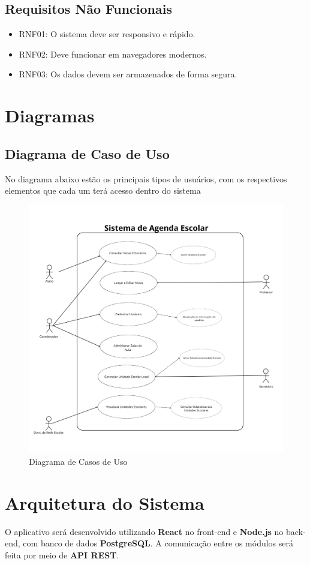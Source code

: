 \documentclass[12pt,a4paper]{report}
\begin{document}
\section{Requisitos Não Funcionais}
\begin{itemize}
    \item RNF01: O sistema deve ser responsivo e rápido.
    \item RNF02: Deve funcionar em navegadores modernos.
    \item RNF03: Os dados devem ser armazenados de forma segura.
\end{itemize}

\chapter{Diagramas}
\section{Diagrama de Caso de Uso}
No diagrama abaixo estão os principais tipos de usuários, com os respectivos elementos que cada um terá acesso dentro do sistema
\begin{figure}[h!]
\centering
\includegraphics[width=.9\textwidth]{imagens/aluno.png}
\caption{Diagrama de Casos de Uso}
\label{Diagrama de Casos de Uso}
\end{figure}



\chapter{Arquitetura do Sistema}
O aplicativo será desenvolvido utilizando \textbf{React} no front-end e \textbf{Node.js} no back-end, com banco de dados \textbf{PostgreSQL}.  
A comunicação entre os módulos será feita por meio de \textbf{API REST}.
\end{document}
